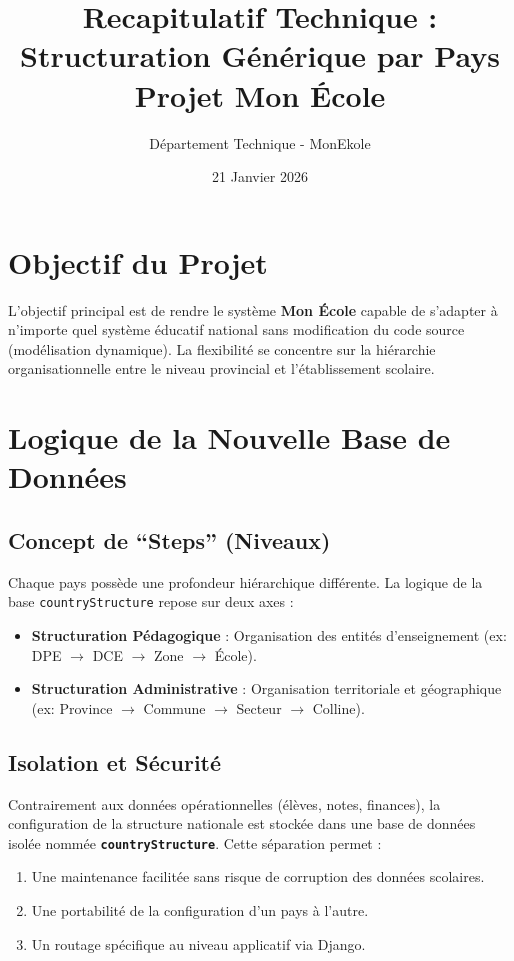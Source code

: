 \documentclass[12pt,a4paper]{article}
\title{Recapitulatif Technique : Structuration G\'en\'erique par Pays\\ \large Projet Mon \'Ecole}
\author{D\'epartement Technique - MonEkole}
\date{21 Janvier 2026}
\begin{document}
\maketitle

\section{Objectif du Projet}
L'objectif principal est de rendre le système \textbf{Mon \'Ecole} capable de s'adapter à n'importe quel système éducatif national sans modification du code source (modélisation dynamique). La flexibilité se concentre sur la hiérarchie organisationnelle entre le niveau provincial et l'établissement scolaire.

\section{Logique de la Nouvelle Base de Données}

\subsection{Concept de ``Steps'' (Niveaux)}
Chaque pays possède une profondeur hiérarchique différente. La logique de la base \texttt{countryStructure} repose sur deux axes :
\begin{itemize}
    \item \textbf{Structuration P\'edagogique} : Organisation des entités d'enseignement (ex: DPE $\to$ DCE $\to$ Zone $\to$ \'Ecole).
    \item \textbf{Structuration Administrative} : Organisation territoriale et géographique (ex: Province $\to$ Commune $\to$ Secteur $\to$ Colline).
\end{itemize}

\subsection{Isolation et S\'ecurit\'e}
Contrairement aux données opérationnelles (élèves, notes, finances), la configuration de la structure nationale est stockée dans une base de données isolée nommée \textbf{\texttt{countryStructure}}. Cette séparation permet :
\begin{enumerate}
    \item Une maintenance facilitée sans risque de corruption des données scolaires.
    \item Une portabilité de la configuration d'un pays à l'autre.
    \item Un routage spécifique au niveau applicatif via Django.
\end{enumerate}
\end{document}
